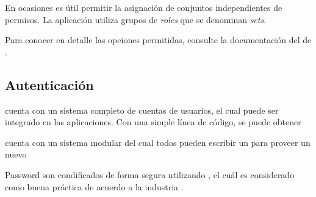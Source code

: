 En ocasiones es útil permitir la asignación de conjuntos independientes de permisos. La aplicación utiliza grupos de \textit{roles} que se denominan \textit{sets}.

Para conocer en detalle las opciones permitidas, consulte la documentación del \packageAS  de \meteorNAME \alanningRolesPackage.


\subsection{Autenticación}

\meteorNAME cuenta con un sistema completo de cuentas de usuarios, el cual puede ser integrado en las aplicaciones. Con una simple línea de código, se puede obtener \

\meteorNAME cuenta con un sistema modular del cual todos pueden escribir un \packageAS para proveer un nuevo

Password son condificados de forma segura utilizando \bcriptCPT, el cuál es considerado como buena práctica de acuerdo a la industria \cite{online_meteor_accounts}.







